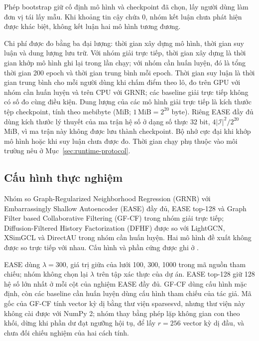 Phép bootstrap giữ cố định mô hình và checkpoint đã chọn, lấy người dùng làm đơn vị tái lấy mẫu. Khi khoảng tin cậy chứa 0, nhóm kết luận chưa phát hiện được khác biệt, không kết luận hai mô hình tương đương.

\label{sec:resource-criteria}

Chi phí được đo bằng ba đại lượng: thời gian xây dựng mô hình, thời gian suy luận và dung lượng lưu trữ. Với nhóm giải trực tiếp, thời gian xây dựng là thời gian khớp mô hình ghi lại trong lần chạy; với nhóm cần huấn luyện, đó là tổng thời gian 200 epoch và thời gian trung bình mỗi epoch. Thời gian suy luận là thời gian trung bình cho mỗi người dùng khi chấm điểm theo lô, đo trên GPU với nhóm cần huấn luyện và trên CPU với GRNR; các baseline giải trực tiếp không có số đo cùng điều kiện. Dung lượng của các mô hình giải trực tiếp là kích thước tệp checkpoint, tính theo mebibyte (MiB; $1\,\mathrm{MiB}=2^{20}$ byte). Riêng EASE đầy đủ dùng kích thước lý thuyết của ma trận hệ số ở dạng số thực 32 bit, $4|\mathcal{I}|^2/2^{20}$ MiB, vì ma trận này không được lưu thành checkpoint. Bộ nhớ cực đại khi khớp mô hình hoặc khi suy luận chưa được đo. Thời gian chạy phụ thuộc vào môi trường nêu ở Mục~\ref{sec:runtime-protocol}.

\subsection{Cấu hình thực nghiệm}
\label{sec:protocol}

\label{sec:baseline-setup}

Nhóm so Graph-Regularized Neighborhood Regression (GRNR) với Embarrassingly Shallow Autoencoder (EASE) đầy đủ, EASE top-128 và Graph Filter based Collaborative Filtering (GF-CF) trong nhóm giải trực tiếp; Diffusion-Filtered History Factorization (DFHF) được so với LightGCN, XSimGCL và DirectAU trong nhóm cần huấn luyện. Hai mô hình đề xuất không được so trực tiếp với nhau. Cấu hình và phần cứng được ghi ở .

EASE dùng $\lambda=300$, giá trị giữa của lưới 100, 300, 1000 trong mã nguồn tham chiếu; nhóm không chọn lại $\lambda$ trên tập xác thực của dự án. EASE top-128 giữ 128 hệ số lớn nhất ở mỗi cột của nghiệm EASE đầy đủ. GF-CF dùng cấu hình mặc định, còn các baseline cần huấn luyện dùng cấu hình tham chiếu của tác giả. Mã gốc của GF-CF tính vector kỳ dị bằng thư viện sparsesvd, nhưng thư viện này không cài được với NumPy 2; nhóm thay bằng phép lặp không gian con theo khối, dừng khi phần dư đạt ngưỡng hội tụ, để lấy $r=256$ vector kỳ dị đầu, và chưa đối chiếu nghiệm của hai cách tính.

